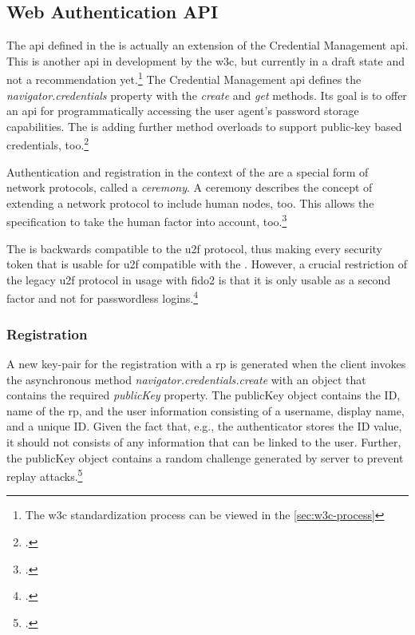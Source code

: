 \subsection{Web Authentication API}
\label{subsec:wa}

The \gls{api} defined in the \wa{} is actually an extension of the Credential Management \gls{api}. This is another \gls{api} in development by the \gls{w3c}, but currently in a draft state and not a recommendation yet.\footnote{The \gls{w3c} standardization process can be viewed in the \autoref{sec:w3c-process}} The Credential Management \gls{api} defines the \textit{navigator.credentials} property with the \textit{create} and \textit{get} methods. Its goal is to offer an \gls{api} for programmatically accessing the user agent's password storage capabilities. The \wa{} is adding further method overloads to support public-key based credentials, too.\footcites[See][Chapter 1]{w3c}[See][Chapter 1.1]{w3c-credentials}

Authentication and registration in the context of the \wa{} are a special form of network protocols, called a \textit{ceremony}. A ceremony describes the concept of extending a network protocol to include human nodes, too. This allows the specification to take the human factor into account, too.\footcite[See][2]{Ellison2007CeremonyDA}

The \wa{} is backwards compatible to the \gls{u2f} protocol, thus making every security token that is usable for \gls{u2f} compatible with the \wa. However, a crucial restriction of the legacy \gls{u2f} protocol in usage with \gls{fido}2 is that it is only usable as a second factor and not for passwordless logins.\footcites[See][Chapter 2.2.1, 6.1.2]{w3c}

\subsubsection{Registration}

A new key-pair for the registration with a \gls{rp} is generated when the client invokes the asynchronous method \textit{navigator.credentials.create} with an object that contains the required \textit{publicKey} property. The publicKey object contains the ID, name of the \gls{rp}, and the user information consisting of a username, display name, and a unique ID. Given the fact that, e.g., the authenticator stores the ID value, it should not consists of any information that can be linked to the user. Further, the publicKey object contains a random challenge generated by server to prevent replay attacks.\footcites[See][Chapter 5.1.3]{w3c}

